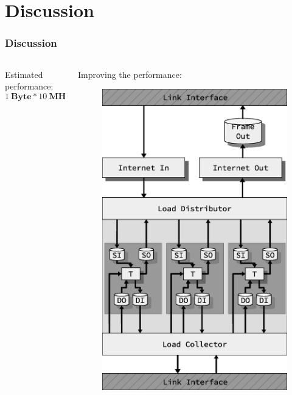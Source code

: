 \section{Discussion}

\begin{frame}
  \frametitle{Discussion}


\begin{columns}
\begin{column}{0.5\textwidth}

Estimated performance:
$$1\:\mathbf{Byte}*10\:\mathbf{MHz}= 80\:\mathbf{Mbps}$$


\end{column}

\begin{column}{0.5\textwidth}

Improving the performance:
\begin{figure}
\centering


\includegraphics[scale=0.25]{../thesis/discussion/design_stacked.eps}
\end{figure}
\end{column}
\end{columns}

\end{frame}



